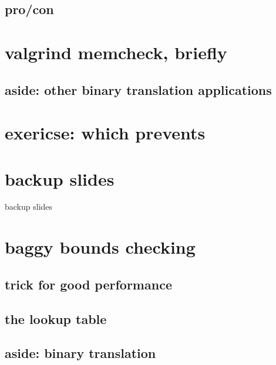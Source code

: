 \subsection{pro/con}


\section{valgrind memcheck, briefly}


\subsection{aside: other binary translation applications}

\section{exericse: which prevents}





\section{backup slides}
\begin{frame}{backup slides}
\end{frame}
\section{baggy bounds checking}


\subsection{trick for good performance}


\subsection{the lookup table}


\subsection{aside: binary translation}




